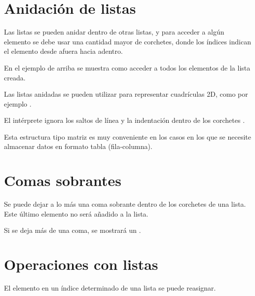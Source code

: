 
\section{Anidación de listas}

Las listas se pueden anidar dentro de otras listas, y para acceder a algún elemento se debe usar una cantidad mayor de corchetes, donde los índices indican el elemento desde afuera hacia adentro.


En el ejemplo de arriba se muestra como acceder a todos los elementos de la lista creada.\smallskip

Las listas anidadas se pueden utilizar para representar cuadrículas 2D, como por ejemplo .


El intérprete ignora los saltos de línea y la indentación dentro de los corchetes \ttt{[]}.\smallskip

Esta estructura tipo matriz es muy conveniente en los casos en los que se necesite almacenar datos en formato tabla (fila-columna).

\section{Comas sobrantes}

Se puede dejar a lo más una coma sobrante dentro de los corchetes de una lista. Este último elemento no será añadido a la lista.


Si se deja más de una coma, se mostrará un .


\section{Operaciones con listas}

El elemento en un índice determinado de una lista se puede reasignar.


